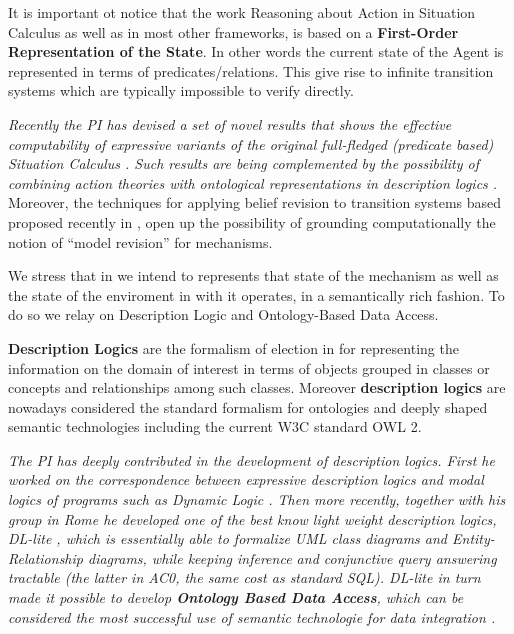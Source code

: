 It is important ot notice that the work Reasoning about Action in
Situation Calculus as well as in most other frameworks, is based on a
\textbf{First-Order Representation of the State}. In other words the
current state of the Agent is represented in terms of
predicates/relations.  This give rise to infinite transition systems
which are typically impossible to verify directly.

\emph{Recently the PI has devised a set of novel results
that shows the effective computability of expressive variants of the
original full-fledged (predicate based) Situation Calculus \cite{DeGiacomoLPV14,DeGiacomoLPV16,DeGiacomoLPS16,BanihashemiGL17,CDMP17}. Such results are being complemented by the
possibility of combining action theories with ontological
representations in description logics \cite{CalvaneseGLR07,CalvaneseGLMS12,HaririCMGMF13,CalvaneseGS15}.} Moreover, the techniques for applying belief revision to
transition systems based proposed
recently in \cite{HerzigMBW14,CarrilloR14}, open up the possibility of grounding
computationally the notion of ``model revision'' for mechanisms.




We stress that in \project we intend to represents that state of the mechanism as well as the state of the enviroment in with it operates, in a semantically rich fashion. To do so we relay on Description Logic and Ontology-Based Data Access.

\textbf{Description Logics} are the formalism of election in for
representing the information on the domain of interest in terms of
objects grouped in classes or concepts and relationships among such
classes.  Moreover \textbf{description logics} are nowadays considered
the standard formalism for ontologies and deeply shaped semantic
technologies including the current W3C standard OWL 2.

\emph{The PI has deeply contributed in the development of description
logics. First he worked on the correspondence between expressive
description logics and modal logics of programs such as Dynamic Logic \cite{DeGiacomoL96,CalvaneseGL98}.
Then more recently, together with his group in Rome he developed one
of the best know light weight description logics, DL-lite \cite{CalvaneseGLLR07}, which is essentially
able to formalize UML class diagrams and Entity-Relationship diagrams,
while keeping inference and conjunctive query answering tractable (the
latter in AC0, the same cost as standard SQL). DL-lite in turn made it possible to develop \textbf{Ontology Based Data Access}, which can be considered the most successful use of semantic technologie for data integration \cite{PoggiLCGLR08,SequedaM17,Statoil17}. }

